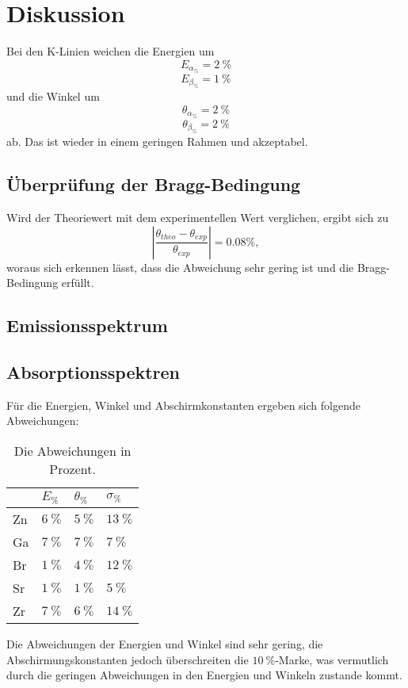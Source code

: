 \section{Diskussion}
Bei den K-Linien weichen die Energien um
\begin{equation*}
  E_{\alpha_{\%}}=2\ \%
\end{equation*}
\begin{equation*}
  E_{\beta_{\%}}=1\ \%
\end{equation*}
und die Winkel um
\begin{equation*}
  \theta_{\alpha_{\%}}=2\ \%
\end{equation*}
\begin{equation*}
  \theta_{\beta_{\%}}=2\ \%
\end{equation*}
ab. Das ist wieder in einem geringen Rahmen und akzeptabel.

\subsection{Überprüfung der Bragg-Bedingung}
Wird der Theoriewert mit dem experimentellen Wert verglichen, ergibt sich zu
\begin{equation*}
  |\frac{\theta_{theo}-\theta_{exp}}{\theta_{exp}}|=0.08\%,
\end{equation*}
woraus sich erkennen lässt, dass die Abweichung sehr gering ist und die Bragg-Bedingung erfüllt.

\subsection{Emissionsspektrum}

\subsection{Absorptionsspektren}
Für die Energien, Winkel und Abschirmkonstanten ergeben sich folgende Abweichungen:
\begin{table}[H]
  \centering
  \begin{tabular}{l|l|l|l}
  & $E_{\%}$ & $\theta_{\%}$ & $\sigma_{\%}$\\ \hline
  Zn & $6\ \%$ & $5\ \%$ & $13\ \%$\\ \hline
  Ga & $7\ \%$ & $7\ \%$ & $7\ \%$\\ \hline
  Br & $1\ \%$ & $4\ \%$ & $12\ \%$\\ \hline
  Sr & $1\ \%$ & $1\ \%$ & $5\ \%$\\ \hline
  Zr & $7\ \%$ & $6\ \%$ & $14\ \%$\\ \hline
  \end{tabular}
  \caption{Die Abweichungen in Prozent.}
\end{table}
Die Abweichungen der Energien und Winkel sind sehr gering, die Abschirmungskonstanten jedoch überschreiten die $10\ \%$-Marke, was vermutlich durch die geringen Abweichungen in den Energien und Winkeln zustande kommt. 

